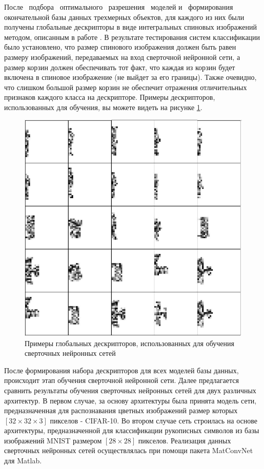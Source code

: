 \documentclass[14pt]{article}
\numberwithin{figure}{section}
\numberwithin{equation}{section}
\begin{document}
 После \ подбора \ оптимального \ разрешения \ моделей и \ формирования окончательной базы данных трехмерных объектов, для каждого из них были получены глобальные дескрипторы в виде интегральных спиновых изображений методом, описанным в работе \cite{Chernikoff}. В результате тестирования систем классификации было установлено, что размер спинового изображения должен быть равен размеру изображений, передаваемых на вход сверточной нейронной сети, а размер корзин должен обеспечивать тот факт, что каждая из корзин будет включена в спиновое изображение (не выйдет за его границы). Также очевидно, что слишком большой размер корзин не обеспечит отражения отличительных признаков каждого класса на дескрипторе. Примеры дескрипторов, использованных для обучения, вы можете видеть на рисунке \ref{ris:8}.

 \begin{figure}[h]
 	\begin{center}
 		\includegraphics[scale=0.75] {8.JPG}
 		\caption{Примеры глобальных дескрипторов, использованных для обучения сверточных нейронных сетей}
 		\label{ris:8}
 	\end{center}
 \end{figure}

После формирования набора дескрипторов для всех моделей базы данных, происходит этап обучения сверточной нейронной сети. Далее предлагается сравнить результаты обучения сверточных нейронных сетей для двух различных архитектур. В первом случае, за основу архитектуры была принята модель сети, предназначенная для распознавания цветных изображений размер которых $[32 \times 32 \times 3]$ пикселов - CIFAR-10. Во втором случае сеть строилась на основе архитектуры, предназначенной для классификации рукописных символов из базы изображений MNIST размером $[28 \times 28]$ пикселов. Реализация данных сверточных нейронных сетей осуществлялась при помощи пакета MatConvNet для Matlab.
\end{document}
